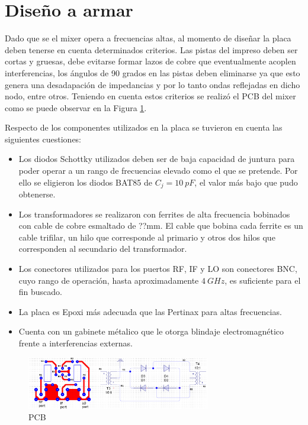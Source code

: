 \documentclass[a4paper,10pt]{article}
\begin{document}
	\section{Diseño a armar}
	\indent Dado que se el mixer opera a frecuencias altas, al momento de dise\~nar la placa deben tenerse en cuenta determinados criterios. Las pistas del impreso deben ser cortas y gruesas, debe evitarse formar lazos de cobre que eventualmente acoplen interferencias, los \'angulos de 90 grados en las pistas deben eliminarse ya que esto genera una desadapaci\'on de impedancias y por lo tanto ondas reflejadas en dicho nodo, entre otros. Teniendo en cuenta estos criterios se realiz\'o el PCB del mixer como se puede observar en la Figura \ref{pcb}.
	
	\indent Respecto de los componentes utilizados en la placa se tuvieron en cuenta las siguientes cuestiones:
	\begin{itemize}
	\item Los diodos Schottky utilizados deben ser de baja capacidad de juntura para poder operar a un rango de frecuencias elevado como el que se pretende. Por ello se eligieron los diodos BAT85 de $C_j=10~pF$, el valor m\'as bajo que pudo obtenerse. 
	\item Los transformadores se realizaron con ferrites de alta frecuencia bobinados con cable de cobre esmaltado de ??mm. El cable que bobina cada ferrite es un cable trifilar, un hilo que corresponde al primario y otros dos hilos que corresponden al secundario del transformador.
	\item Los conectores utilizados para los puertos RF, IF y LO son conectores BNC, cuyo rango de operaci\'on, hasta aproximadamente $4~GHz$, es suficiente para el fin buscado.
	\item La placa es Epoxi m\'as adecuada que las Pertinax para altas frecuencias.
	\item Cuenta con un gabinete m\'etalico que le otorga blindaje electromagn\'etico frente a interferencias externas.
	\end{itemize}
	 
	\begin{figure}[!htb]
		\centering
		\includegraphics[width=8cm]{Images/PCB.png}
		\caption{PCB}
		\label{pcb}
	\end{figure}
	
\end{document}
